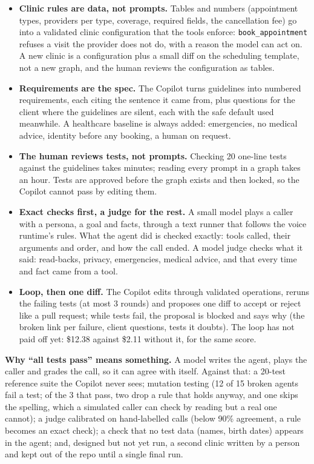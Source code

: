\documentclass[11pt,a4paper]{article}
\newcommand{\code}[1]{\texttt{\small #1}}
\begin{document}
\begin{itemize}
  \item \textbf{Clinic rules are data, not prompts.} Tables and numbers (appointment types, providers per type, coverage, required fields, the cancellation fee) go into a validated clinic configuration that the tools enforce: \code{book\_appointment} refuses a visit the provider does not do, with a reason the model can act on. A new clinic is a configuration plus a small diff on the scheduling template, not a new graph, and the human reviews the configuration as tables.
  \item \textbf{Requirements are the spec.} The Copilot turns guidelines into numbered requirements, each citing the sentence it came from, plus questions for the client where the guidelines are silent, each with the safe default used meanwhile. A healthcare baseline is always added: emergencies, no medical advice, identity before any booking, a human on request.
  \item \textbf{The human reviews tests, not prompts.} Checking 20 one-line tests against the guidelines takes minutes; reading every prompt in a graph takes an hour. Tests are approved before the graph exists and then locked, so the Copilot cannot pass by editing them.
  \item \textbf{Exact checks first, a judge for the rest.} A small model plays a caller with a persona, a goal and facts, through a text runner that follows the voice runtime's rules. What the agent did is checked exactly: tools called, their arguments and order, and how the call ended. A model judge checks what it said: read-backs, privacy, emergencies, medical advice, and that every time and fact came from a tool.
  \item \textbf{Loop, then one diff.} The Copilot edits through validated operations, reruns the failing tests (at most 3 rounds) and proposes one diff to accept or reject like a pull request; while tests fail, the proposal is blocked and says why (the broken link per failure, client questions, tests it doubts). The loop has not paid off yet: \$12.38 against \$2.11 without it, for the same score.
\end{itemize}

\textbf{Why ``all tests pass'' means something.} A model writes the agent, plays the caller and grades the call, so it can agree with itself. Against that: a 20-test reference suite the Copilot never sees; mutation testing (12 of 15 broken agents fail a test; of the 3 that pass, two drop a rule that holds anyway, and one skips the spelling, which a simulated caller can check by reading but a real one cannot); a judge calibrated on hand-labelled calls (below 90\% agreement, a rule becomes an exact check); a check that no test data (names, birth dates) appears in the agent; and, designed but not yet run, a second clinic written by a person and kept out of the repo until a single final run.
\end{document}
